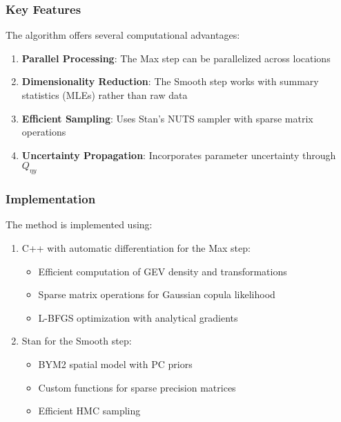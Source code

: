 \documentclass[
  letterpaper,
  DIV=11,
  numbers=noendperiod]{scrartcl}
\providecommand{\tightlist}{%
  \setlength{\itemsep}{0pt}\setlength{\parskip}{0pt}}\usepackage{longtable,booktabs,array}
\begin{document}
\subsubsection{Key Features}\label{key-features}

The algorithm offers several computational advantages:

\begin{enumerate}
\def\labelenumi{\arabic{enumi}.}
\tightlist
\item
  \textbf{Parallel Processing}: The Max step can be parallelized across
  locations
\item
  \textbf{Dimensionality Reduction}: The Smooth step works with summary
  statistics (MLEs) rather than raw data
\item
  \textbf{Efficient Sampling}: Uses Stan's NUTS sampler with sparse
  matrix operations
\item
  \textbf{Uncertainty Propagation}: Incorporates parameter uncertainty
  through \(Q_{\eta y}\)
\end{enumerate}

\subsubsection{Implementation}\label{implementation}

The method is implemented using:

\begin{enumerate}
\def\labelenumi{\arabic{enumi}.}
\tightlist
\item
  C++ with automatic differentiation for the Max step:

  \begin{itemize}
  \tightlist
  \item
    Efficient computation of GEV density and transformations
  \item
    Sparse matrix operations for Gaussian copula likelihood
  \item
    L-BFGS optimization with analytical gradients
  \end{itemize}
\item
  Stan for the Smooth step:

  \begin{itemize}
  \tightlist
  \item
    BYM2 spatial model with PC priors
  \item
    Custom functions for sparse precision matrices
  \item
    Efficient HMC sampling
  \end{itemize}
\end{enumerate}
\end{document}
